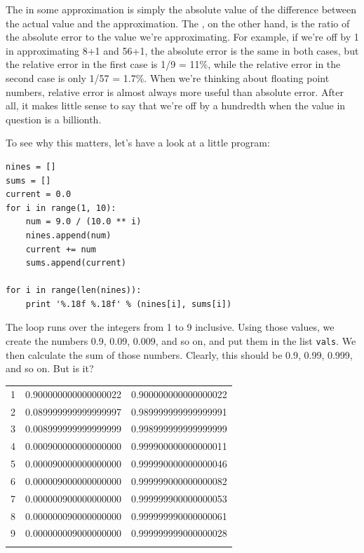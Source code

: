 \documentclass{book}
\begin{document}
The  in some approximation is
simply the absolute value of the difference between the actual value and
the approximation. The , on
the other hand, is the ratio of the absolute error to the value we're
approximating. For example, if we're off by 1 in approximating 8+1 and
56+1, the absolute error is the same in both cases, but the relative
error in the first case is 1/9 = 11\%, while the relative error in the
second case is only 1/57 = 1.7\%. When we're thinking about floating
point numbers, relative error is almost always more useful than absolute
error. After all, it makes little sense to say that we're off by a
hundredth when the value in question is a billionth.

To see why this matters, let's have a look at a little program:

\begin{verbatim}
nines = []
sums = []
current = 0.0
for i in range(1, 10):
    num = 9.0 / (10.0 ** i)
    nines.append(num)
    current += num
    sums.append(current)

for i in range(len(nines)):
    print '%.18f %.18f' % (nines[i], sums[i])
\end{verbatim}

The loop runs over the integers from 1 to 9 inclusive. Using those
values, we create the numbers 0.9, 0.09, 0.009, and so on, and put them
in the list \texttt{vals}. We then calculate the sum of those numbers.
Clearly, this should be 0.9, 0.99, 0.999, and so on. But is it?

\begin{tabular}{lll}
\hline\noalign{\medskip}
1 & 0.900000000000000022 & 0.900000000000000022
\\\noalign{\medskip}
2 & 0.089999999999999997 & 0.989999999999999991
\\\noalign{\medskip}
3 & 0.008999999999999999 & 0.998999999999999999
\\\noalign{\medskip}
4 & 0.000900000000000000 & 0.999900000000000011
\\\noalign{\medskip}
5 & 0.000090000000000000 & 0.999990000000000046
\\\noalign{\medskip}
6 & 0.000009000000000000 & 0.999999000000000082
\\\noalign{\medskip}
7 & 0.000000900000000000 & 0.999999900000000053
\\\noalign{\medskip}
8 & 0.000000090000000000 & 0.999999990000000061
\\\noalign{\medskip}
9 & 0.000000009000000000 & 0.999999999000000028
\\\noalign{\medskip}
\hline
\end{tabular}
\end{document}
